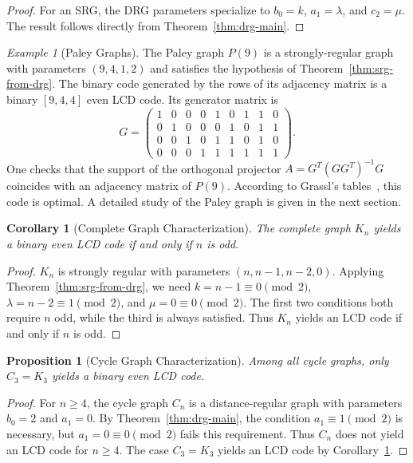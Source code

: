 \documentclass[a4paper,11pt]{article}
\newtheorem{corollary}[theorem]{Corollary}
\newtheorem{proposition}[theorem]{Proposition}
\theoremstyle{remark}
\newtheorem{example}[theorem]{Example}
\begin{document}
\begin{proof}
For an SRG, the DRG parameters specialize to $b_0 = k$, $a_1 = \lambda$, and $c_2 = \mu$. The result follows directly from Theorem~\ref{thm:drg-main}.
\end{proof}

\begin{example}[Paley Graphs]\label{ex:paley}
The Paley graph $P(9)$ is a strongly-regular graph with parameters $(9,4,1,2)$ and satisfies the hypothesis of Theorem~\ref{thm:srg-from-drg}.
The binary code generated by the rows of its adjacency matrix is a binary $[9,4,4]$ even LCD code.
Its generator matrix is
\[
G = \left(\begin{array}{rrrrrrrrr}
1 & 0 & 0 & 0 & 1 & 0 & 1 & 1 & 0 \\
0 & 1 & 0 & 0 & 0 & 1 & 0 & 1 & 1 \\
0 & 0 & 1 & 0 & 1 & 1 & 0 & 1 & 0 \\
0 & 0 & 0 & 1 & 1 & 1 & 1 & 1 & 1
\end{array}\right).
\]
One checks that the support of the orthogonal projector $A=G^T(GG^T)^{-1}G$ coincides with an adjacency matrix of $P(9)$.
According to Grassl's tables~\cite{grassl}, this code is optimal.
A detailed study of the Paley graph is given in the next section.
\end{example}

\begin{corollary}[Complete Graph Characterization]\label{cor:complete-graph}
The complete graph $K_n$ yields a binary even LCD code if and only if $n$ is odd.
\end{corollary}

\begin{proof}
$K_n$ is strongly regular with parameters $(n, n-1, n-2, 0)$. Applying Theorem~\ref{thm:srg-from-drg}, we need $k = n-1 \equiv 0 \pmod 2$, $\lambda = n-2 \equiv 1 \pmod 2$, and $\mu = 0 \equiv 0 \pmod 2$. The first two conditions both require $n$ odd, while the third is always satisfied. Thus $K_n$ yields an LCD code if and only if $n$ is odd.
\end{proof}

\begin{proposition}[Cycle Graph Characterization]\label{prop:cycle-graph}
Among all cycle graphs, only $C_3 = K_3$ yields a binary even LCD code.
\end{proposition}

\begin{proof}
For $n \geq 4$, the cycle graph $C_n$ is a distance-regular graph with parameters $b_0 = 2$ and $a_1 = 0$. By Theorem~\ref{thm:drg-main}, the condition $a_1 \equiv 1 \pmod 2$ is necessary, but $a_1 = 0 \equiv 0 \pmod 2$ fails this requirement. Thus $C_n$ does not yield an LCD code for $n \geq 4$. The case $C_3 = K_3$ yields an LCD code by Corollary~\ref{cor:complete-graph}.
\end{proof}
\end{document}
